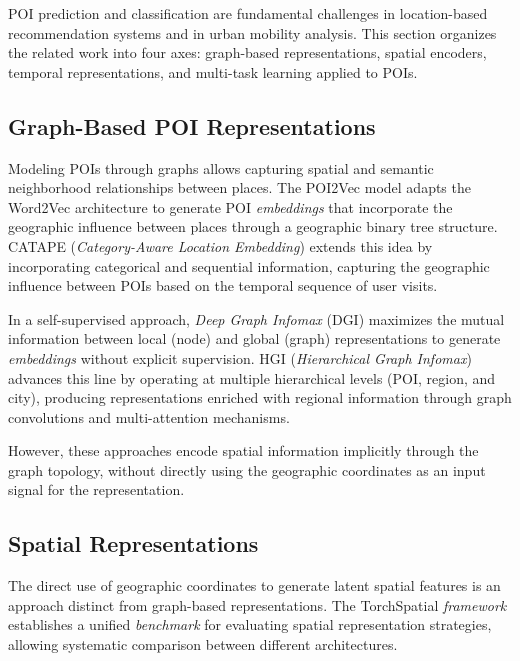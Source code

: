POI prediction and classification are fundamental challenges in location-based recommendation systems and in urban mobility analysis. This section organizes the related work into four axes: graph-based representations, spatial encoders, temporal representations, and multi-task learning applied to POIs.

\subsection{Graph-Based POI Representations}

Modeling POIs through graphs allows capturing spatial and semantic neighborhood relationships between places. The POI2Vec model \cite{feng2017poi2vec} adapts the Word2Vec architecture to generate POI \textit{embeddings} that incorporate the geographic influence between places through a geographic binary tree structure. CATAPE (\textit{Category-Aware Location Embedding}) \cite{rahmani2019category} extends this idea by incorporating categorical and sequential information, capturing the geographic influence between POIs based on the temporal sequence of user visits.

In a self-supervised approach, \textit{Deep Graph Infomax} (DGI) \cite{velickovic2019deep} maximizes the mutual information between local (node) and global (graph) representations to generate \textit{embeddings} without explicit supervision. HGI (\textit{Hierarchical Graph Infomax}) \cite{huang2023learning} advances this line by operating at multiple hierarchical levels (POI, region, and city), producing representations enriched with regional information through graph convolutions and multi-attention mechanisms.

However, these approaches encode spatial information implicitly through the graph topology, without directly using the geographic coordinates as an input signal for the representation.

\subsection{Spatial Representations}

The direct use of geographic coordinates to generate latent spatial features is an approach distinct from graph-based representations. The TorchSpatial \textit{framework} \cite{wu2024torchspatial} establishes a unified \textit{benchmark} for evaluating spatial representation strategies, allowing systematic comparison between different architectures.

